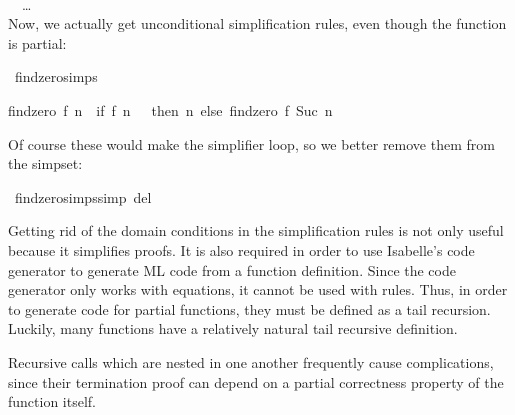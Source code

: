 \begin{isabellebody}
\begin{isamarkuptext}
\vspace{1ex}
\noindent{} \\%
\isanewline%
\ \ \ldots\\%

  
  \noindent Now, we actually get unconditional simplification rules, even
  though the function is partial:%
\end{isamarkuptext}%
\isamarkuptrue%
\isamarkupfalse%
\ findzero{}simps%
\begin{isamarkuptext}%
\begin{isabelle}%
findzero\ {}f\ {}n\ {}\ {}if\ {}f\ {}n\ {}\ {}\ then\ {}n\ else\ findzero\ {}f\ {}Suc\ {}n{}{}%
\end{isabelle}

  \noindent Of course these would make the simplifier loop, so we better remove
  them from the simpset:%
\end{isamarkuptext}%
\isamarkuptrue%
\isamarkupfalse%
\ findzero{}simps{}simp\ del{}%
\begin{isamarkuptext}%
Getting rid of the domain conditions in the simplification rules is
  not only useful because it simplifies proofs. It is also required in
  order to use Isabelle's code generator to generate ML code
  from a function definition.
  Since the code generator only works with equations, it cannot be
  used with  rules. Thus, in order to generate code for
  partial functions, they must be defined as a tail recursion.
  Luckily, many functions have a relatively natural tail recursive
  definition.%
\end{isamarkuptext}%
\isamarkuptrue%
%
\isamarkuptrue%
%
\begin{isamarkuptext}%
Recursive calls which are nested in one another frequently cause
  complications, since their termination proof can depend on a partial
  correctness property of the function itself. 


\end{isamarkuptext}
\end{isabellebody}
